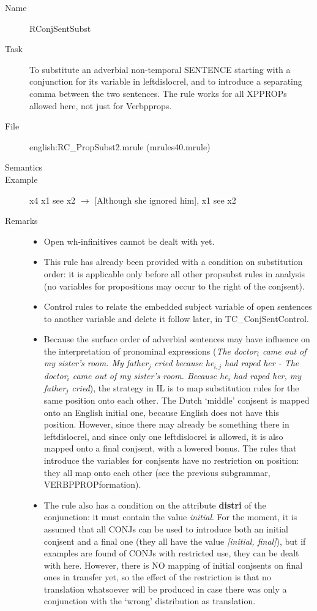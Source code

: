 \begin{description}
\vspace{1 cm}
\begin{description}
\item[Name]   RConjSentSubst
\item[Task] To substitute an adverbial non-temporal SENTENCE starting with a 
conjunction for its variable in 
leftdislocrel, and to introduce a separating comma between the two sentences.
The rule 
works for all XPPROPs allowed here, not just for Verbpprops.
\item[File] english:RC\_PropSubst2.mrule (mrules40.mrule)
\item[Semantics]
\item[Example] x4 x1 see x2 $\rightarrow$ [Although she ignored him], x1 
see x2 
\item[Remarks] \mbox{}
\begin{itemize}
\item Open wh-infinitives cannot be dealt with yet. 
\item This rule has already been provided with a condition on substitution 
order: it is applicable only before all other propsubst rules in analysis 
(no variables for propositions may occur to the right of the conjsent).
\item Control rules to relate the embedded subject variable of open sentences 
to another variable and delete it follow later, in TC\_ConjSentControl.
\item Because the surface order of adverbial sentences may have influence on 
the interpretation of pronominal expressions ({\em The doctor$_{i}$ came out of 
my sister's room. My father$_{j}$ cried 
because he$_{i,j}$ had raped her - The doctor$_{i}$ came out of 
my sister's room. Because he$_{i}$ had raped her, my 
father$_{j}$ cried\/}), the strategy in IL is to map substitution rules for the
same position onto each other. The Dutch `middle' conjsent is mapped onto an 
English initial one, because English does not have this position. However, 
since there may already be something there in leftdislocrel, and since only one 
leftdislocrel is allowed, it is also mapped onto a final conjsent, with a 
lowered bonus. The rules that introduce the variables for conjsents have no 
restriction on position: they all map onto each other (see the previous 
subgrammar, VERBPPROPformation).
\item The rule also has a condition on the attribute {\bf distri} of the 
conjunction: it must contain the value {\em initial\/}. For the moment, it is 
assumed that all CONJs can be used to introduce both an initial conjsent and a 
final one (they all have the value {\em [initial, final]\/}), but if examples 
are found of CONJs with restricted use, they can be dealt with here. However, 
there is NO mapping of initial conjsents on final ones in transfer yet, so the
effect of the restriction is that no translation whatsoever will be produced in 
case there was only a conjunction with the `wrong' distribution as translation.
\end{itemize}
\end{description}


\end{description}
